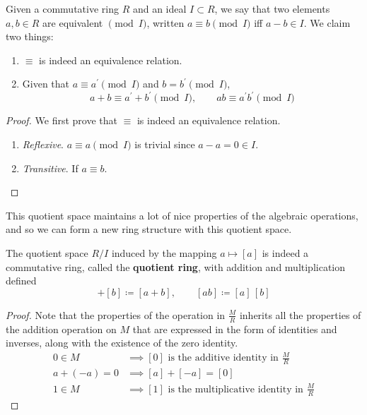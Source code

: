   \begin{theorem}
    Given a commutative ring $R$ and an ideal $I \subset R$, we say that two elements $a, b \in R$ are equivalent $\pmod{I}$, written $a \equiv b \pmod{I}$ iff $a - b \in I$. We claim two things: 
    \begin{enumerate}
      \item $\equiv$ is indeed an equivalence relation. 
      \item Given that $a \equiv a^\prime \pmod{I}$ and $b = b^\prime \pmod{I}$, 
        \begin{equation}
          a + b \equiv a^\prime + b^\prime \pmod{I}, \qquad ab \equiv a^\prime b^\prime \pmod{I}
        \end{equation}
    \end{enumerate}
  \end{theorem}
  \begin{proof}
    We first prove that $\equiv$ is indeed an equivalence relation. 
    \begin{enumerate}
      \item \textit{Reflexive}. $a \equiv a \pmod{I}$ is trivial since $a - a = 0 \in I$. 
      \item \textit{Transitive}. If $a \equiv b$. 
    \end{enumerate}
  \end{proof} 

  This quotient space maintains a lot of nice properties of the algebraic operations, and so we can form a new ring structure with this quotient space.  

  \begin{definition}
    The quotient space $R/I$ induced by the mapping $a \mapsto [a]$ is indeed a commutative ring, called the \textbf{quotient ring}, with addition and multiplication defined 
    \begin{equation}
      [a] + [b] \coloneqq [a + b], \qquad [ab] \coloneqq [a] \, [b]
    \end{equation}
  \end{definition}
  \begin{proof}
    Note that the properties of the operation in $\frac{M}{R}$ inherits all the properties of the addition operation on $M$ that are expressed in the form of identities and inverses, along with the existence of the zero identity. 
    \begin{align*}
      0 \in M & \implies [0] \text{ is the additive identity in } \frac{M}{R} \\
      a + (-a) = 0 & \implies [a] + [-a] = [0] \\
      1 \in M & \implies [1] \text{ is the multiplicative identity in } \frac{M}{R}
    \end{align*}
  \end{proof} 

